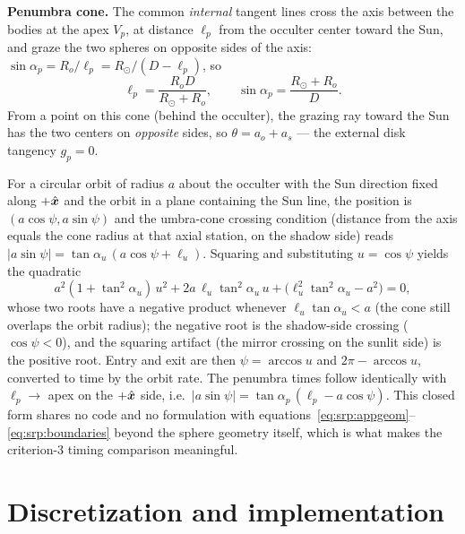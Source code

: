 \textbf{Penumbra cone.} The common \emph{internal} tangent lines cross
the axis between the bodies at the apex $V_{p}$, at distance $\ell_{p}$
from the occulter center toward the Sun, and graze the two spheres on
opposite sides of the axis: $\sin\alpha_{p} = R_{o}/\ell_{p} =
R_{\odot}/(D - \ell_{p})$, so
\begin{equation}
  \ell_{p} = \frac{R_{o} D}{R_{\odot} + R_{o}},
  \qquad
  \sin\alpha_{p} = \frac{R_{\odot} + R_{o}}{D}.
  \label{eq:srp:penumbracone}
\end{equation}
From a point on this cone (behind the occulter), the grazing ray toward
the Sun has the two centers on \emph{opposite} sides, so
$\theta = a_{o} + a_{s}$ --- the external disk tangency $g_{p} = 0$.

For a circular orbit of radius $a$ about the occulter with the Sun
direction fixed along $+\hat{\bm{x}}$ and the orbit in a plane
containing the Sun line, the position is $(a\cos\psi, a\sin\psi)$ and
the umbra-cone crossing condition (distance from the axis equals the
cone radius at that axial station, on the shadow side) reads
$\lvert a \sin\psi \rvert = \tan\alpha_{u}\,(a\cos\psi + \ell_{u})$.
Squaring and substituting $u = \cos\psi$ yields the quadratic
\begin{equation}
  a^{2} (1 + \tan^{2}\alpha_{u})\, u^{2}
  + 2 a\, \ell_{u} \tan^{2}\alpha_{u}\, u
  + \bigl( \ell_{u}^{2} \tan^{2}\alpha_{u} - a^{2} \bigr) = 0,
  \label{eq:srp:conequadratic}
\end{equation}
whose two roots have a negative product whenever
$\ell_{u} \tan\alpha_{u} < a$ (the cone still overlaps the orbit
radius); the negative root is the shadow-side crossing
($\cos\psi < 0$), and the squaring artifact (the mirror crossing on the
sunlit side) is the positive root. Entry and exit are then
$\psi = \arccos u$ and $2\pi - \arccos u$, converted to time by the
orbit rate. The penumbra times follow identically with
$\ell_{p} \to$ apex on the $+\hat{\bm{x}}$ side, i.e.\
$\lvert a \sin\psi \rvert = \tan\alpha_{p}\,(\ell_{p} - a\cos\psi)$.
This closed form shares no code and no formulation with
equations~\eqref{eq:srp:appgeom}--\eqref{eq:srp:boundaries} beyond the
sphere geometry itself, which is what makes the criterion-3 timing
comparison meaningful.

\section{Discretization and implementation}
\label{sec:srp:implementation}

